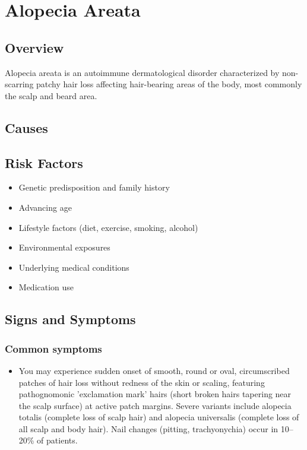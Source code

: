 \chapter{Alopecia Areata}
\label{sec:Alopecia Areata}

\section{Overview}
Alopecia areata is an autoimmune dermatological disorder characterized by non-scarring patchy hair loss affecting hair-bearing areas of the body, most commonly the scalp and beard area.
\section{Causes}
\section{Risk Factors}

\begin{itemize}[noitemsep]
  \item Genetic predisposition and family history
  \item Advancing age
  \item Lifestyle factors (diet, exercise, smoking, alcohol)
  \item Environmental exposures
  \item Underlying medical conditions
  \item Medication use
\end{itemize}
\section{Signs and Symptoms}

\subsection{Common symptoms}
\begin{itemize}[noitemsep]
  \item You may experience sudden onset of smooth, round or oval, circumscribed patches of hair loss without redness of the skin or scaling, featuring pathognomonic 'exclamation mark' hairs (short broken hairs tapering near the scalp surface) at active patch margins. Severe variants include alopecia totalis (complete loss of scalp hair) and alopecia universalis (complete loss of all scalp and body hair). Nail changes (pitting, trachyonychia) occur in 10--20\% of patients. 
  \end{itemize}

